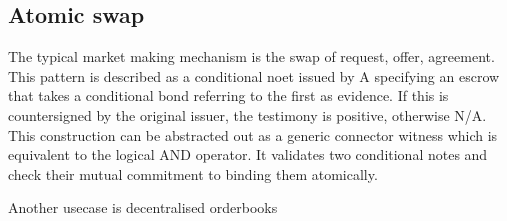 \subsection{Atomic swap}

The typical market making mechanism is the swap of request, offer, agreement.
This pattern is described as a 
conditional noet issued by A specifying an escrow that takes a conditional bond referring to the first as evidence. 
If this is countersigned by the original issuer, the testimony is positive, otherwise N/A.
This construction can be abstracted out as a generic connector witness which is equivalent to the logical AND operator. It validates two conditional notes and check their mutual commitment to binding them atomically. 

Another usecase is decentralised orderbooks